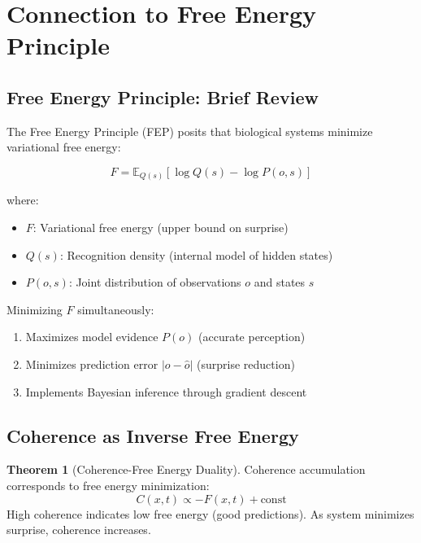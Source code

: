 \documentclass[11pt,a4paper]{article}
\theoremstyle{definition}
\newtheorem{theorem}{Theorem}[section]
\theoremstyle{remark}
\begin{document}
\section{Connection to Free Energy Principle}
\label{sec:fep-connection}

\subsection{Free Energy Principle: Brief Review}

The Free Energy Principle (FEP) \cite{friston2010free} posits that biological systems minimize variational free energy:

\begin{equation}
F = \mathbb{E}_{Q(s)}[\log Q(s) - \log P(o,s)]
\label{eq:fep}
\end{equation}

where:
\begin{itemize}
\item $F$: Variational free energy (upper bound on surprise)
\item $Q(s)$: Recognition density (internal model of hidden states)
\item $P(o,s)$: Joint distribution of observations $o$ and states $s$
\end{itemize}

Minimizing $F$ simultaneously:
\begin{enumerate}
\item Maximizes model evidence $P(o)$ (accurate perception)
\item Minimizes prediction error $|o - \hat{o}|$ (surprise reduction)
\item Implements Bayesian inference through gradient descent
\end{enumerate}

\subsection{Coherence as Inverse Free Energy}

\begin{theorem}[Coherence-Free Energy Duality]
Coherence accumulation corresponds to free energy minimization:
\begin{equation}
C(x,t) \propto -F(x,t) + \text{const}
\label{eq:coherence-free-energy}
\end{equation}
High coherence indicates low free energy (good predictions). As system minimizes surprise, coherence increases.
\end{theorem}
\end{document}
